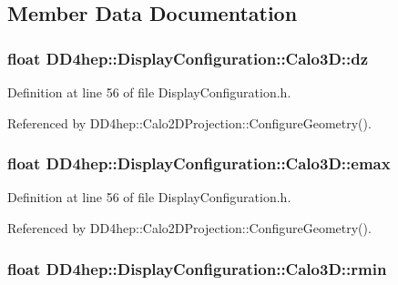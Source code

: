 \subsection{Member Data Documentation}
\hypertarget{struct_d_d4hep_1_1_display_configuration_1_1_calo3_d_a4c83ddd5abab41aede5327a47d1bffcc}{
\subsubsection[{dz}]{\setlength{\rightskip}{0pt plus 5cm}float {\bf DD4hep::DisplayConfiguration::Calo3D::dz}}}
\label{struct_d_d4hep_1_1_display_configuration_1_1_calo3_d_a4c83ddd5abab41aede5327a47d1bffcc}


Definition at line 56 of file DisplayConfiguration.h.

Referenced by DD4hep::Calo2DProjection::ConfigureGeometry().\hypertarget{struct_d_d4hep_1_1_display_configuration_1_1_calo3_d_a2a0ed0362e5b09927938df5c3d98d6b9}{
\subsubsection[{emax}]{\setlength{\rightskip}{0pt plus 5cm}float {\bf DD4hep::DisplayConfiguration::Calo3D::emax}}}
\label{struct_d_d4hep_1_1_display_configuration_1_1_calo3_d_a2a0ed0362e5b09927938df5c3d98d6b9}


Definition at line 56 of file DisplayConfiguration.h.

Referenced by DD4hep::Calo2DProjection::ConfigureGeometry().\hypertarget{struct_d_d4hep_1_1_display_configuration_1_1_calo3_d_ade7d636fe0552c821c519d838ec4e9cc}{
\subsubsection[{rmin}]{\setlength{\rightskip}{0pt plus 5cm}float {\bf DD4hep::DisplayConfiguration::Calo3D::rmin}}}
\label{struct_d_d4hep_1_1_display_configuration_1_1_calo3_d_ade7d636fe0552c821c519d838ec4e9cc}


